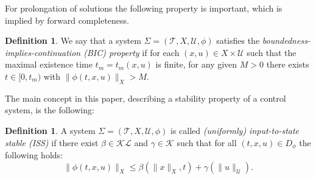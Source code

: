 \documentclass[twocolumn]{IEEEtran} %
\theoremstyle{definition}
\newtheorem{definition}[theorem]{Definition}
\newcommand{\tm}{\times}%
\newcommand{\Uc}{\mathcal{U}}%
\newcommand{\K}{\mathcal{K}}%
\newcommand{\KL}{\mathcal{KL}}%
\newcommand{\ep}{\varepsilon}%
\newcommand{\T}{\ensuremath{\mathcal{T}}}  %
\begin{document}
%


For prolongation of solutions the following property is important, which is implied by forward completeness.
\begin{definition}\label{def_BIC} 
We say that a system $\Sigma = (\T,X,\Uc,\phi)$ satisfies the \emph{boundedness-implies-continuation (BIC) property} if for each $(x,u)\in X \tm \Uc$ such that the maximal existence time $t_m = t_m(x,u)$ is finite, for any given $M>0$ there exists $t \in [0,t_m)$ with $\|\phi(t,x,u)\|_X > M$.
\end{definition}

The main concept in this paper, describing a stability property of a control system, is the following:%

\begin{definition}\label{def_ISS}
A system $\Sigma = (\T,X,\Uc,\phi)$ is called \emph{(uniformly) input-to-state stable (ISS)} if there exist $\beta \in \KL$ and $\gamma \in \K$ such that for all $(t,x,u) \in D_{\phi}$ the following  holds:%
\begin {equation}\label{eq_iss}
  \|\phi(t,x,u)\|_X \leq \beta(\|x\|_X,t) + \gamma(\|u\|_{\Uc}).%
\end{equation}
\end{definition}
\end{document}
